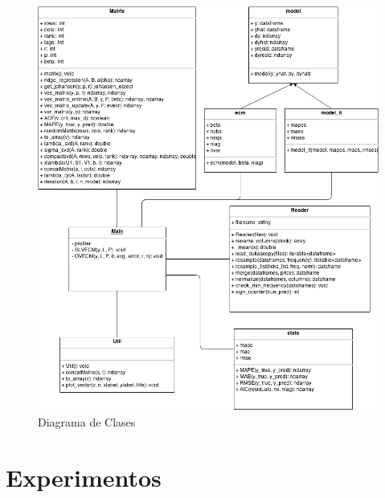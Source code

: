 \documentclass{beamer}
\begin{document}
            \begin{frame}
            \begin{figure}[h!t]
                \begin{center}
                    \includegraphics[width=0.8\textheight]{img/class_diagram.png}
                    \caption{Diagrama de Clases}
                    \label{fig:class_diagram}
                \end{center}
            \end{figure}

            \end{frame}
    \section{Experimentos}
\end{document}
